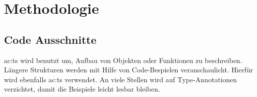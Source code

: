 \chapter{Methodologie}




\section{Code Ausschnitte}

\acrlong{ac:ts} wird benutzt um, Aufbau von Objekten oder Funktionen zu beschreiben. Längere Strukturen werden mit Hilfe von Code-Bespielen veranschaulicht. Hierfür wird ebenfalls \acrlong{ac:ts} verwendet. An viele Stellen wird auf Type-Annotationen verzichtet, damit die Beispiele leicht lesbar bleiben.